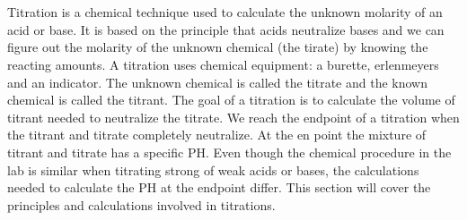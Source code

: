 \documentclass[main.tex]{subfiles}
\begin{document}
\section{\color{blue!30!black}{Titrations}}
Titration is a chemical technique used to calculate the unknown molarity of an acid or base. It is based on the principle that acids neutralize bases and we can figure out the molarity of the unknown chemical (the tirate) by knowing the reacting amounts. A titration uses chemical equipment: a burette, erlenmeyers and an indicator. The unknown chemical is called the titrate and the known chemical is called the titrant. The goal of a titration is to calculate the volume of titrant needed to neutralize the titrate. We reach the endpoint of a titration when the titrant and titrate completely neutralize. At the en point the mixture of titrant and titrate has a specific PH. Even though the chemical procedure in the lab is similar when titrating strong of weak acids or bases, the calculations needed to calculate the PH at the endpoint differ. This section will cover the principles and calculations involved in titrations.
\sloppy
\end{document}
